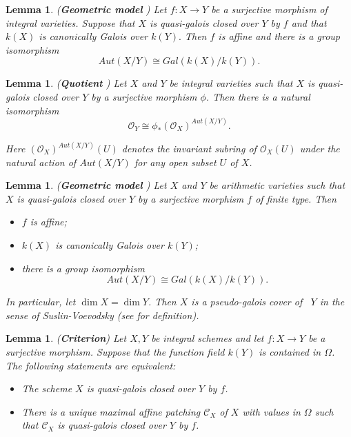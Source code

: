 \documentclass[12pt,twoside,reqno]{amsart}
\newtheorem{lemma}[theorem]{Lemma}
\theoremstyle{definition}
\numberwithin{equation}{section}
\begin{document}
\begin{lemma}
\emph{(\textbf{Geometric model} \cite{An5})}
Let $f:X\rightarrow Y$ be a surjective morphism of integral varieties.
Suppose that $X$ is quasi-galois closed over $Y$ by $f$ and that $k\left( X\right) $
is canonically Galois over $k\left( Y\right) .$ Then $f$ is
affine and there is a group isomorphism
\begin{equation*}
Aut\left( X/Y\right) \cong Gal\left( k\left( X\right) /k\left( Y\right)
\right) .
\end{equation*}
\end{lemma}

\begin{lemma}
\emph{(\textbf{Quotient} \cite{An5})}
Let $X$ and $Y$ be integral varieties such that $X$ is quasi-galois closed
over $Y$ by a surjective morphism $\phi $. Then there is a natural
isomorphism
\begin{equation*}
\mathcal{O}_{Y}\cong \phi _{\ast }(\mathcal{O}_{X})^{{Aut}\left( X/Y\right) }.
\end{equation*}

Here $(\mathcal{O}_{X})^{{Aut}\left( X/Y\right) }(U)$ denotes the invariant
subring of $\mathcal{O}_{X}(U)$ under the natural action of ${Aut}\left(
X/Y\right) $ for any open subset $U$ of $X$.
\end{lemma}

\begin{lemma}
\emph{(\textbf{Geometric model} \cite{An2,An2*})}
Let $X$ and $Y$ be arithmetic
varieties such that $X$ is quasi-galois closed over $Y$ by a
surjective morphism $f$ of finite type. Then
\begin{itemize}
\item $f$ is affine;

\item $k\left( X\right) $ is canonically Galois
over $k(Y)$;

\item there is a group isomorphism
$$
{Aut}\left( X/Y\right) \cong Gal(k\left( X\right) /k(Y)).
$$
\end{itemize}

In particular, let $\dim X=\dim Y$. Then
$X$ is a pseudo-galois cover of \, $Y$ in the sense of Suslin-Voevodsky \emph{(see \cite{sv1,sv2} for definition)}.
\end{lemma}


\begin{lemma}
\emph{(\textbf{Criterion})}
Let $X,Y$ be integral schemes and let $f :X\rightarrow Y$ be a surjective morphism.
Suppose that the function field $k(Y)$ is contained in $\Omega$. The following statements are equivalent:
\begin{itemize}
\item The scheme $X$ is
quasi-galois closed over $Y$ by $f$.

\item There is a unique maximal affine
patching $\mathcal{C}_{X}$ of $X$ with values in $\Omega $ such that $\mathcal{C}_{X}$ is quasi-galois closed over $Y$ by $f$.
\end{itemize}
\end{lemma}
\end{document}
